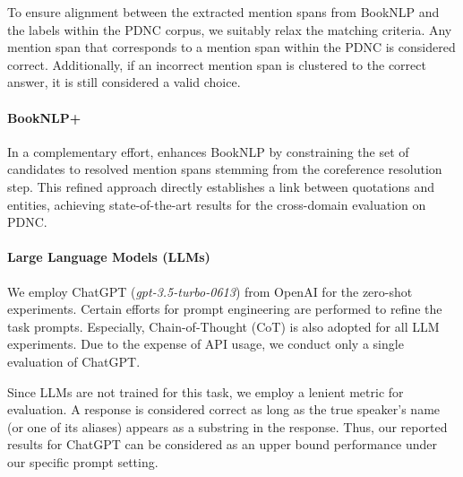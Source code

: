 \documentclass[letterpaper]{article} %
\begin{document}
To ensure alignment between the extracted mention spans from BookNLP and the labels within the PDNC corpus, we suitably relax the matching criteria. Any mention span that corresponds to a mention span within the PDNC is considered correct. Additionally, if an incorrect mention span is clustered to the correct answer, it is still considered a valid choice.

\paragraph{BookNLP+}
In a complementary effort, \citet{DBLP:conf/acl/VishnubhotlaRHH23} enhances BookNLP by constraining the set of candidates to resolved mention spans stemming from the coreference resolution step. This refined approach directly establishes a link between quotations and entities, achieving state-of-the-art results for the cross-domain evaluation on PDNC.

\paragraph{Large Language Models (LLMs)}
We employ ChatGPT (\textit{gpt-3.5-turbo-0613}) from OpenAI for the zero-shot experiments. Certain efforts for prompt engineering are performed to refine the task prompts. Especially, Chain-of-Thought (CoT) \cite{cot} is also adopted for all LLM experiments. 
Due to the expense of API usage, we conduct only a single evaluation of ChatGPT.

Since LLMs are not trained for this task, we employ a lenient metric for evaluation. A response is considered correct as long as the true speaker's name (or one of its aliases) appears as a substring in the response. Thus, our reported results for ChatGPT can be considered as an upper bound performance under our specific prompt setting.
\end{document}
